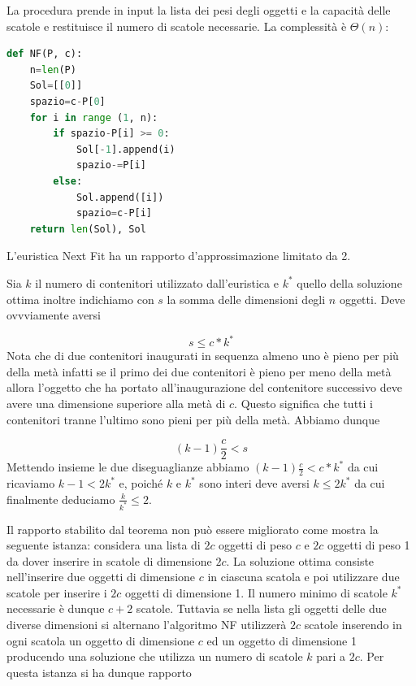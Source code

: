 La procedura prende in input la lista dei pesi degli oggetti e la capacità delle scatole e restituisce il numero di scatole necessarie. La complessità è $\Theta(n)$:

\begin{lstlisting}[language=Python]
def NF(P, c):
    n=len(P)
    Sol=[[0]]
    spazio=c-P[0]
    for i in range (1, n):
        if spazio-P[i] >= 0:
            Sol[-1].append(i)
            spazio-=P[i]
        else:
            Sol.append([i])
            spazio=c-P[i]
    return len(Sol), Sol
\end{lstlisting}
L'euristica Next Fit ha un rapporto d'approssimazione limitato da 2.

Sia $k$ il numero di contenitori utilizzato dall'euristica e $k^*$ quello della soluzione ottima inoltre indichiamo con $s$ la somma delle dimensioni degli $n$ oggetti. Deve ovvviamente aversi

\begin{equation*}
    s\leq c*k^*
\end{equation*}
Nota che di due contenitori inaugurati in sequenza almeno uno è pieno per più della metà infatti se il primo dei due contenitori è pieno per meno della metà allora l'oggetto che ha portato all'inaugurazione del contenitore successivo deve avere una dimensione superiore alla metà di $c$. Questo significa che tutti i contenitori tranne l'ultimo sono pieni per più della metà. Abbiamo dunque

\begin{equation*}
    (k-1)\frac{c}{2}<s
\end{equation*}
Mettendo insieme le due diseguaglianze abbiamo $(k - 1)\frac{c}{2} < c * k^*$ da cui ricaviamo $k - 1 < 2k^*$ e, poiché $k$ e $k^*$ sono interi deve aversi $k \leq 2k^*$ da cui finalmente  deduciamo $\frac{k}{k^*}\leq 2$.

Il rapporto stabilito dal teorema non può essere migliorato come mostra la seguente istanza: considera una lista di $2c$ oggetti di peso $c$ e $2c$ oggetti di peso 1 da dover inserire
in scatole di dimensione $2c$. La soluzione ottima consiste nell'inserire due oggetti di dimensione $c$ in ciascuna scatola e poi utilizzare due scatole per inserire i $2c$ oggetti di dimensione 1. Il numero minimo di scatole $k^*$ necessarie è dunque $c + 2$ scatole. Tuttavia se nella lista gli oggetti delle due diverse dimensioni si alternano l'algoritmo NF utilizzerà $2c$ scatole inserendo in ogni scatola un oggetto di dimensione $c$ ed un oggetto di dimensione 1 producendo una soluzione che utilizza un numero di scatole $k$ pari a $2c$. Per questa istanza si ha dunque rapporto 

